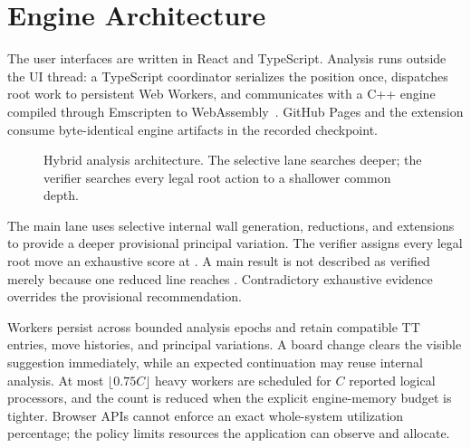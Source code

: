 \section{Engine Architecture}
The user interfaces are written in React and TypeScript. Analysis runs outside the UI thread: a TypeScript coordinator serializes the position once, dispatches root work to persistent Web Workers, and communicates with a C++ engine compiled through Emscripten to WebAssembly~\cite{emscriptenModularized,wasmCore}. GitHub Pages and the \walper{} extension consume byte-identical engine artifacts in the recorded checkpoint.

\begin{figure}[t]
\centering

\caption{Hybrid analysis architecture. The selective lane searches deeper; the verifier searches every legal root action to a shallower common depth.}
\label{fig:architecture}
\end{figure}

The main lane uses selective internal wall generation, reductions, and extensions to provide a deeper provisional principal variation. The verifier assigns every legal root move an exhaustive score at \verifiedDepth. A main result is not described as verified merely because one reduced line reaches \selDepth. Contradictory exhaustive evidence overrides the provisional recommendation.

Workers persist across bounded analysis epochs and retain compatible TT entries, move histories, and principal variations. A board change clears the visible suggestion immediately, while an expected continuation may reuse internal analysis. At most $\lfloor0.75C\rfloor$ heavy workers are scheduled for $C$ reported logical processors, and the count is reduced when the explicit engine-memory budget is tighter. Browser APIs cannot enforce an exact whole-system utilization percentage; the policy limits resources the application can observe and allocate.
